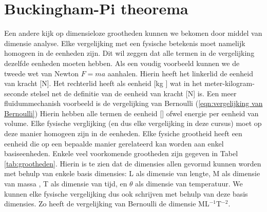 	\section{Buckingham-Pi theorema}
Een andere kijk op dimensieloze grootheden kunnen we bekomen door middel van dimensie analyse. Elke vergelijking met een fysische betekenis moet namelijk homogeen in de eenheden zijn. Dit wil zeggen dat alle termen in de vergelijking dezelfde eenheden moeten hebben. Als een voudig voorbeeld kunnen we de tweede wet van Newton $F=ma$ aanhalen. Hierin heeft het linkerlid de eenheid van kracht [\unit{}{N}]. Het rechterlid heeft als eenheid [\unit{}{kg }] wat in het meter-kilogram-seconde stelsel net de definitie van de eenheid van kracht [\unit{}{N}] is. Een meer flu\"idummechanish voorbeeld is de vergelijking van Bernoulli (\ref{eqn:vergelijking van Bernoulli}) Hierin hebben alle termen de eenheid [\unit{}{}] ofwel energie per eenheid van volume. Elke fysische verglijking (en dus elke vergelijking in deze cursus) moet op deze manier homogeen zijn in de eenheden.
\npar
Elke fysiche grootheid heeft een eenheid die op een bepaalde manier gerelateerd kan worden aan enkel basiseenheden. Enkele veel voorkomende grootheden zijn gegeven in Tabel \ref{tab:grootheden}. Hierin is te zien dat de dimensies allen gevormd kunnen worden met behulp van enkele basis dimensies: L als dimensie van lengte, M als dimensie van massa , T als dimensie van tijd, en $\theta$ als dimensie van temperatuur. We kunnen elke fysische vergelijking dus ook schrijven met behulp van deze basis dimensies. Zo heeft de vergelijking van Bernoulli de dimensie ML$^{-1}$T$^{-2}$.
